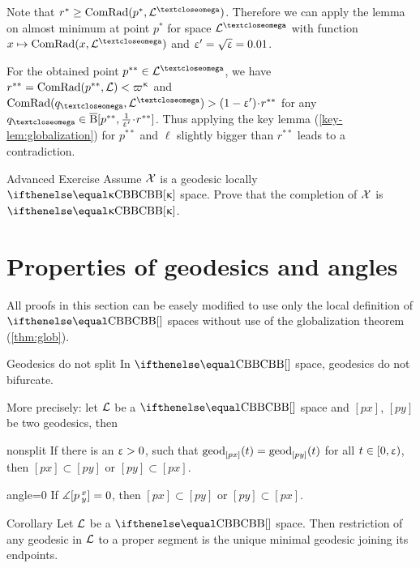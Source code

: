 Note that $r^*\ge\ComRad(p^*,\spc{L}^\o)$.
Therefore we can apply the lemma on almost minimum 
at point $p^*$ for space $\spc{L}^\o$
with function $x\mapsto\ComRad(x,\spc{L}^\o)$
and $\upvarepsilon'=\sqrt{\upvarepsilon}=0.01$.

For the obtained point $p^{{*}{*}}\in \spc{L}^\o$, we have $r^{{*}{*}}\z=\ComRad(p^{{*}{*}},\spc{L})\z<\varpi\kappa$ 
and 
$\ComRad(q_\o,\spc{L}^\o)\z> (1-\eps')\cdot r^{{*}{*}}$ for any $q_\o\in\cBall[p^{{*}{*}},\tfrac{1}{\eps'}\cdot r^{{*}{*}}]$. 
Thus applying the key lemma (\ref{key-lem:globalization}) for $p^{{*}{*}}$ and $\ell$ slightly bigger than $r^{{*}{*}}$ leads to a contradiction.
\qeds

\begin{thm}{Advanced Exercise}
Assume $\mathcal{X}$ is a geodesic locally  $\Alex\kappa$ space. 
Prove that the completion of $\mathcal{X}$ is $\Alex\kappa$.
\end{thm}



\section{Properties of geodesics and angles}\label{sec:prop.geod}

All proofs in this section can be easely modified to use only the local definition of $\Alex{}$ spaces without use of the globalization theorem (\ref{thm:glob}).
 
\begin{thm}{Geodesics do not split}\label{thm:g-split}
In $\Alex{}$ space, geodesics do not bifurcate.

More precisely: let $\mathcal{L}$ be a $\Alex{}$ space and $[p x]$, $[p y]$ be two geodesics, then
\begin{subthm}{nonsplit} If  there is an $\upvarepsilon>0$, such that $\mathrm{geod}_{[p x]}(t)=\mathrm{geod}_{[p y]}(t)$ 
for all $t\in[0,\eps)$, 
then $[p x]\subset [p y]$ or $[p y]\subset [p x]$.
\end{subthm}

\begin{subthm}{angle=0}
If $\measuredangle[p\,{}^{x}_{y}]=0$, then $[p x]\subset [p y]$ or $[p y]\subset [p x]$.
\end{subthm}
\end{thm}

\begin{thm}{Corollary}
Let $\mathcal{L}$ be a $\Alex{}$ space.
Then restriction of any geodesic in $\mathcal{L}$ to a proper segment is the unique minimal geodesic joining its endpoints.
\end{thm}

